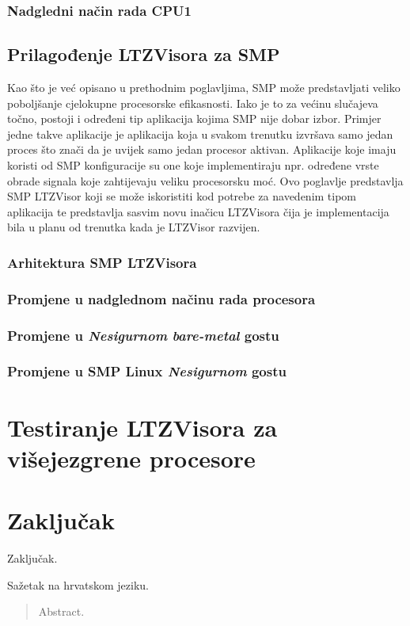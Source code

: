 \documentclass[times, utf8, diplomski, numeric]{fer}
\begin{document}
\subsection{Nadgledni način rada CPU1}
\section{Prilagođenje LTZVisora za SMP}
Kao što je već opisano u prethodnim poglavljima, SMP može predstavljati veliko poboljšanje cjelokupne procesorske efikasnosti.
Iako je to za većinu slučajeva točno, postoji i određeni tip aplikacija kojima SMP nije dobar izbor. Primjer jedne takve
aplikacije je aplikacija koja u svakom trenutku izvršava samo jedan proces što znači da je uvijek samo jedan procesor aktivan.
Aplikacije koje imaju koristi od SMP konfiguracije su one koje implementiraju npr. određene vrste obrade signala koje
zahtijevaju veliku procesorsku moć. Ovo poglavlje predstavlja SMP LTZVisor koji se može iskoristiti kod potrebe za navedenim
tipom aplikacija te predstavlja sasvim novu inačicu LTZVisora čija je implementacija bila u planu od trenutka kada je LTZVisor
razvijen.

\subsection{Arhitektura SMP LTZVisora}
\subsection{Promjene u nadglednom načinu rada procesora}
\subsection{Promjene u \textit{Nesigurnom} \textit{bare-metal} gostu}
\subsection{Promjene u SMP Linux \textit{Nesigurnom} gostu}

\chapter{Testiranje LTZVisora za višejezgrene procesore}

\chapter{Zaključak}
Zaključak.




\begin{sazetak}
Sažetak na hrvatskom jeziku.

\end{sazetak}

\begin{abstract}
Abstract.

\end{abstract}
\end{document}
